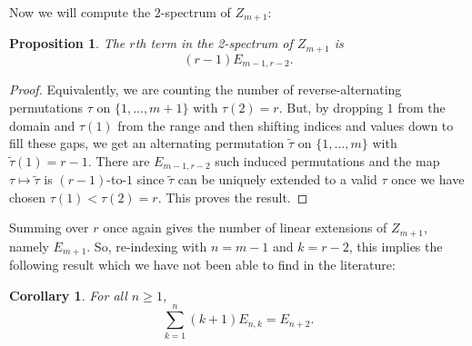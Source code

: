 \documentclass{article}
\newtheorem{proposition}[theorem]{Proposition}
\newtheorem{corollary}[theorem]{Corollary}
\theoremstyle{definition}
\newcommand{\ent}[2]{E_{#1,#2}}
\begin{document}
%
%
%
%
%

Now we will compute the 2-spectrum of $Z_{m+1}$:

\begin{proposition}\label{prop:zigzag 2-spectrum}
	The $r$th term in the 2-spectrum of $Z_{m+1}$ is
	\[
		(r-1)\ent{m-1}{r-2}.
	\]
\end{proposition}

\begin{proof}
	Equivalently, we are counting the number of reverse-alternating permutations $\tau$ on $\{1, \dots , m+1\}$ with $\tau(2) = r$. But, by dropping $1$ from the domain and $\tau(1)$ from the range and then shifting indices and values down to fill these gaps, we get an alternating permutation $\widetilde{\tau}$ on $\{1, \dots , m\}$ with $\widetilde{\tau}(1) = r-1$. There are $\ent{m-1}{r-2}$ such induced permutations and the map $\tau \mapsto \widetilde{\tau}$ is $(r-1)$-to-$1$ since $\widetilde{\tau}$ can be uniquely extended to a valid $\tau$ once we have chosen $\tau(1) < \tau(2) = r$. This proves the result.
\end{proof}

Summing  over $r$ once again gives the number of linear extensions of $Z_{m+1}$, namely $E_{m+1}$. So, re-indexing with $n=m-1$ and $k=r-2$, this implies the following result which we have not been able to find in the literature:

\begin{corollary}\label{cor:entringer sum}
	For all $n\geq 1$,
	\begin{equation}\label{eq:entringer sum}
		\sum_{k=1}^{n} (k+1) \ent{n}{k} = E_{n+2}.
	\end{equation}
\end{corollary}
\end{document}
